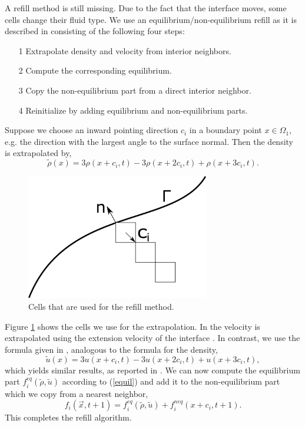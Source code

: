 \documentclass[final,leqno,onefignum,onetabnum]{siamltexmm}
\begin{document}
A refill method is still missing. Due to the fact that the interface moves, some cells change their fluid type. We use an equilibrium/non-equilibrium refill as it is described in \cite{Caiazzo} consisting of the following four steps:
\begin{itemize}
	\item[1] Extrapolate density and velocity from interior neighbors.
	\item[2] Compute the corresponding equilibrium.
	\item[3] Copy the non-equilibrium part from a direct interior neighbor.
	\item[4] Reinitialize by adding equilibrium and non-equilibrium parts.
\end{itemize}
Suppose we choose an inward pointing direction $c_i$ in a boundary point $x \in \Omega_1$, e.g. the direction with the largest angle to the surface normal. Then the density is extrapolated by,
\begin{equation}
  \tilde{\rho}(x) = 3\rho(x+c_i,t) - 3\rho(x+2c_i,t) + \rho(x+3c_i,t).
\end{equation}
\begin{figure}
	\hfill\includegraphics[width=8cm,natwidth=445,natheight=305]{refillmethod.png}\hspace*{\fill}
	\caption{Cells that are used for the refill method.}
	\label{refill}
\end{figure}
Figure \ref{refill} shows the cells we use for the extrapolation. In \cite{Thoemmes} the velocity is extrapolated using the extension velocity of the interface \cite{Adalsteinsson}. In contrast, we use the formula given in \cite{Lallemand}, analogous to the formula for the density,
\begin{equation}
  \tilde{u}(x) = 3u(x+c_i,t) - 3u(x+2c_i,t) + u(x+3c_i,t),
\end{equation}
which yields similar results, as reported in \cite{Lallemand}.
We can now compute the equilibrium part $f_i^{eq}(\tilde{\rho},\tilde{u})$ according to (\ref{equil}) and add it to the non-equilibrium part which we copy from a nearest neighbor,
$$f_i(\vec{x},t+1) = f_i^{eq}(\tilde{\rho},\tilde{u}) + f_i^{neq}(x+c_i,t+1) \text{.}$$
This completes the refill algorithm.
\end{document}
